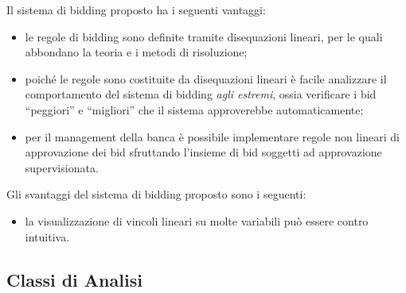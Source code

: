 Il sistema di bidding proposto ha i seguenti vantaggi:
\begin{itemize}
	\item le regole di bidding sono definite tramite disequazioni lineari, per le quali abbondano la teoria e i metodi di risoluzione;

	\item poiché le regole sono costituite da disequazioni lineari è facile analizzare il comportamento del sistema di bidding \emph{agli estremi}, ossia verificare i bid ``peggiori'' e ``migliori'' che il sistema approverebbe automaticamente;

	\item per il management della banca è possibile implementare regole non lineari di approvazione dei bid sfruttando l'insieme di bid soggetti ad approvazione supervisionata.
\end{itemize}

Gli svantaggi del sistema di bidding proposto sono i seguenti:
\begin{itemize}
	\item la visualizzazione di vincoli lineari su molte variabili può essere contro intuitiva.
\end{itemize}

\subsection{Classi di Analisi}


